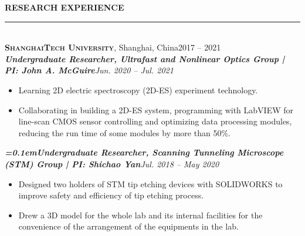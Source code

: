 \documentclass[letterpaper,11pt]{article}
\begin{document}
{\Large\bfseries{}RESEARCH EXPERIENCE}\\
\rule[1.5ex]{\columnwidth}{1pt}
\vspace{-4ex}\\
{\large\bfseries\scshape{}ShanghaiTech University}, Shanghai, China\hfill{2017 -- 2021}\\
{\bfseries\itshape{}Undergraduate Researcher, Ultrafast and Nonlinear Optics Group | PI: John A. McGuire}\hfill{\itshape{}Jun. 2020 -- Jul. 2021}\\
\vspace{-4ex}
\begin{itemize}
    \item Learning 2D electric spectroscopy (2D-ES) experiment technology.
    \item Collaborating in building a 2D-ES system, programming with LabVIEW for line-scan CMOS sensor controlling and optimizing data processing modules, reducing the run time of some modules by more than 50\%.
\end{itemize}
\vspace{-1ex}
{\bfseries\itshape{}\font=0.1em{}Undergraduate Researcher, Scanning Tunneling Microscope (STM) Group | PI: Shichao Yan}\hfill{\itshape{}Jul. 2018 -- May 2020}\\
\vspace{-4ex}
\begin{itemize}
    \item Designed two holders of STM tip etching devices with SOLIDWORKS to improve safety and efficiency of tip etching process.
    \item Drew a 3D model for the whole lab and its internal facilities for the convenience of the arrangement of the equipments in the lab.
\end{itemize}
\end{document}
